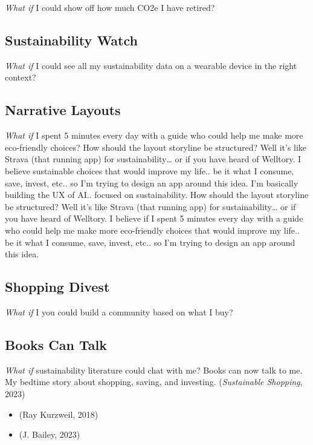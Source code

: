 \documentclass[
  letterpaper,
  DIV=11,
  numbers=noendperiod]{scrartcl}
\providecommand{\tightlist}{%
  \setlength{\itemsep}{0pt}\setlength{\parskip}{0pt}}\usepackage{longtable,booktabs,array}
\begin{document}
\emph{What if} I could show off how much CO2e I have retired?

\subsection{Sustainability Watch}\label{sustainability-watch}

\emph{What if} I could see all my sustainability data on a wearable
device in the right context?

\subsection{Narrative Layouts}\label{narrative-layouts}

\emph{What if} I spent 5 minutes every day with a guide who could help
me make more eco-friendly choices? How should the layout storyline be
structured? Well it's like Strava (that running app) for
sustainability\ldots{} or if you have heard of Welltory. I believe
sustainable choices that would improve my life.. be it what I consume,
save, invest, etc.. so I'm trying to design an app around this idea. I'm
basically building the UX of AI.. focused on sustainability. How should
the layout storyline be structured? Well it's like Strava (that running
app) for sustainability\ldots{} or if you have heard of Welltory. I
believe if I spent 5 minutes every day with a guide who could help me
make more eco-friendly choices that would improve my life.. be it what I
consume, save, invest, etc.. so I'm trying to design an app around this
idea.

\subsection{Shopping Divest}\label{shopping-divest}

\emph{What if} I you could build a community based on what I buy?

\subsection{Books Can Talk}\label{books-can-talk}

\emph{What if} sustainability literature could chat with me? Books can
now talk to me. My bedtime story about shopping, saving, and investing.
(\emph{Sustainable {Shopping}}, 2023)

\begin{itemize}
\tightlist
\item
  (Ray Kurzweil, 2018)
\item
  (J. Bailey, 2023)
\end{itemize}
\end{document}
